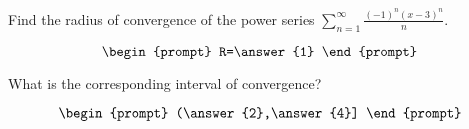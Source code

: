 \documentclass{ximera}
\author{Gregory Hartman \and Matthew Carr}
\begin{document}
\begin{exercise}




Find the radius of convergence of the power series $\sum_{n=1}^{\infty}\frac{(-1)^{n} (x-3)^{n}}{n}$.

\[
\begin{prompt}
R=\answer{1}
\end{prompt}
\]

What is the corresponding interval of convergence?

\[
\begin{prompt}
(\answer{2},\answer{4}]
\end{prompt}
\]

\end{exercise}
\end{document}
